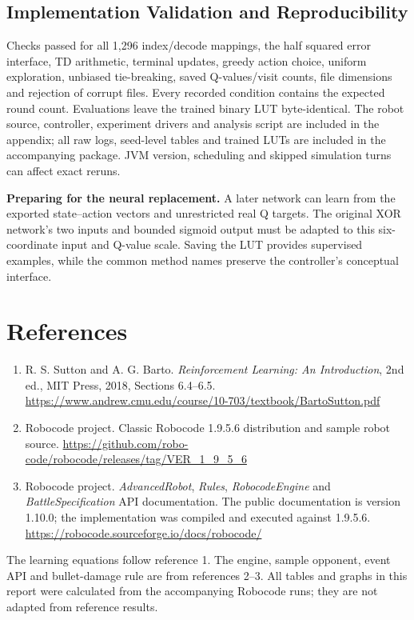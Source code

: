 \documentclass[11pt,letterpaper]{article}
\begin{document}
\newpage
\subsection*{Implementation Validation and Reproducibility}
Checks passed for all 1,296 index/decode mappings, the half squared error interface, TD arithmetic, terminal updates, greedy action choice, uniform exploration, unbiased tie-breaking, saved Q-values/visit counts, file dimensions and rejection of corrupt files. Every recorded condition contains the expected round count. Evaluations leave the trained binary LUT byte-identical. The robot source, controller, experiment drivers and analysis script are included in the appendix; all raw logs, seed-level tables and trained LUTs are included in the accompanying package. JVM version, scheduling and skipped simulation turns can affect exact reruns.

\textbf{Preparing for the neural replacement.} A later network can learn from the exported state--action vectors and unrestricted real Q targets. The original XOR network's two inputs and bounded sigmoid output must be adapted to this six-coordinate input and Q-value scale. Saving the LUT provides supervised examples, while the common method names preserve the controller's conceptual interface.

\section*{References}
\begin{enumerate}
\item R. S. Sutton and A. G. Barto. \emph{Reinforcement Learning: An Introduction}, 2nd ed., MIT Press, 2018, Sections 6.4--6.5. \url{https://www.andrew.cmu.edu/course/10-703/textbook/BartoSutton.pdf}
\item Robocode project. Classic Robocode 1.9.5.6 distribution and sample robot source. \url{https://github.com/robo-code/robocode/releases/tag/VER_1_9_5_6}
\item Robocode project. \emph{AdvancedRobot}, \emph{Rules}, \emph{RobocodeEngine} and \emph{BattleSpecification} API documentation. The public documentation is version 1.10.0; the implementation was compiled and executed against 1.9.5.6. \url{https://robocode.sourceforge.io/docs/robocode/}
\end{enumerate}
The learning equations follow reference 1. The engine, sample opponent, event API and bullet-damage rule are from references 2--3. All tables and graphs in this report were calculated from the accompanying Robocode runs; they are not adapted from reference results.
\end{document}
